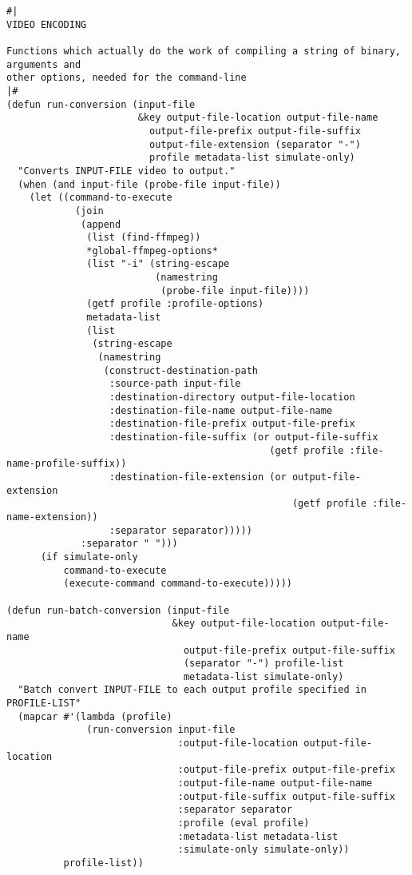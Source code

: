 \documentclass{article}
\begin{document}
\begin{verbatim}
#|
VIDEO ENCODING

Functions which actually do the work of compiling a string of binary, arguments and
other options, needed for the command-line
|#
(defun run-conversion (input-file
                       &key output-file-location output-file-name
                         output-file-prefix output-file-suffix
                         output-file-extension (separator "-")
                         profile metadata-list simulate-only)
  "Converts INPUT-FILE video to output."
  (when (and input-file (probe-file input-file))
    (let ((command-to-execute
            (join
             (append
              (list (find-ffmpeg))
              *global-ffmpeg-options*
              (list "-i" (string-escape
                          (namestring
                           (probe-file input-file))))
              (getf profile :profile-options)
              metadata-list
              (list
               (string-escape 
                (namestring
                 (construct-destination-path
                  :source-path input-file
                  :destination-directory output-file-location
                  :destination-file-name output-file-name
                  :destination-file-prefix output-file-prefix
                  :destination-file-suffix (or output-file-suffix
                                              (getf profile :file-name-profile-suffix))
                  :destination-file-extension (or output-file-extension
                                                  (getf profile :file-name-extension))
                  :separator separator)))))
             :separator " ")))
      (if simulate-only
          command-to-execute
          (execute-command command-to-execute)))))

(defun run-batch-conversion (input-file
                             &key output-file-location output-file-name
                               output-file-prefix output-file-suffix
                               (separator "-") profile-list
                               metadata-list simulate-only)
  "Batch convert INPUT-FILE to each output profile specified in
PROFILE-LIST"
  (mapcar #'(lambda (profile)
              (run-conversion input-file
                              :output-file-location output-file-location
                              :output-file-prefix output-file-prefix
                              :output-file-name output-file-name
                              :output-file-suffix output-file-suffix
                              :separator separator
                              :profile (eval profile)
                              :metadata-list metadata-list
                              :simulate-only simulate-only))
          profile-list))
\end{verbatim}
\end{document}
